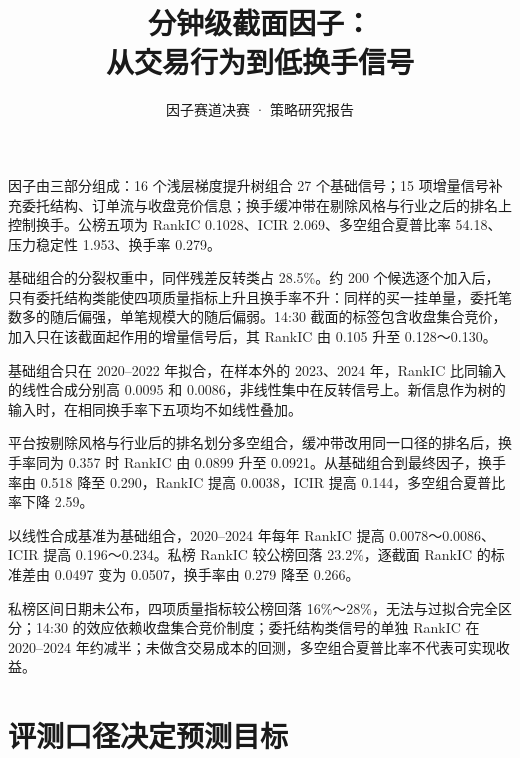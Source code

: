 \documentclass[UTF8,a4paper,zihao=-4,fontset=none]{ctexart}
\title{分钟级截面因子：\\从交易行为到低换手信号}
\subtitle{因子赛道决赛 · 策略研究报告}
\begin{document}
\makereporttitle

\begin{keypoints}
\item {}因子由三部分组成：16 个浅层梯度提升树组合 27 个基础信号；15 项增量信号补充委托结构、订单流与收盘竞价信息；换手缓冲带在剔除风格与行业之后的排名上控制换手。公榜五项为 RankIC 0.1028、ICIR 2.069、多空组合夏普比率 54.18、压力稳定性 1.953、换手率 0.279。
\item {}基础组合的分裂权重中，同伴残差反转类占 28.5\%。约 200 个候选逐个加入后，只有委托结构类能使四项质量指标上升且换手率不升：同样的买一挂单量，委托笔数多的随后偏强，单笔规模大的随后偏弱。14:30 截面的标签包含收盘集合竞价，加入只在该截面起作用的增量信号后，其 RankIC 由 0.105 升至 0.128～0.130。
\item {}基础组合只在 2020–2022 年拟合，在样本外的 2023、2024 年，RankIC 比同输入的线性合成分别高 0.0095 和 0.0086，非线性集中在反转信号上。新信息作为树的输入时，在相同换手率下五项均不如线性叠加。
\item {}平台按剔除风格与行业后的排名划分多空组合，缓冲带改用同一口径的排名后，换手率同为 0.357 时 RankIC 由 0.0899 升至 0.0921。从基础组合到最终因子，换手率由 0.518 降至 0.290，RankIC 提高 0.0038，ICIR 提高 0.144，多空组合夏普比率下降 2.59。
\item {}以线性合成基准为基础组合，2020–2024 年每年 RankIC 提高 0.0078～0.0086、ICIR 提高 0.196～0.234。私榜 RankIC 较公榜回落 23.2\%，逐截面 RankIC 的标准差由 0.0497 变为 0.0507，换手率由 0.279 降至 0.266。
\item {}私榜区间日期未公布，四项质量指标较公榜回落 16\%～28\%，无法与过拟合完全区分；14:30 的效应依赖收盘集合竞价制度；委托结构类信号的单独 RankIC 在 2020–2024 年约减半；未做含交易成本的回测，多空组合夏普比率不代表可实现收益。
\end{keypoints}

{\linespread{1.2}\selectfont\tableofcontents}
\newpage

\section{评测口径决定预测目标}\label{sec:ch1}
\end{document}
